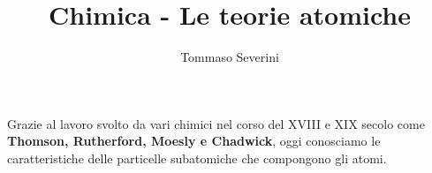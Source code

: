\documentclass[10pt,a4paper]{article}
\author{Tommaso Severini}
\title{Chimica - Le teorie atomiche}
\begin{document}
	\maketitle
	
	Grazie al lavoro svolto da vari chimici nel corso del XVIII e XIX secolo come \textbf{Thomson, Rutherford, Moesly e Chadwick}, oggi conosciamo le caratteristiche delle particelle subatomiche che compongono gli atomi.
\end{document}
